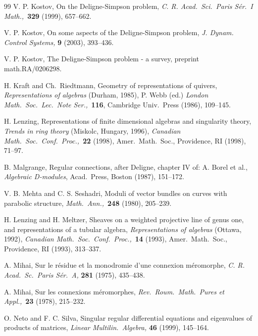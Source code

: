 \documentclass{amsart}
\theoremstyle{plain}
\theoremstyle{definition}
\theoremstyle{remark}
\newcommand{\smalltextsc}[1]{#1}
\begin{document}
\begin{thebibliography}{99}
V. P. \smalltextsc{Kostov},
On the Deligne-Simpson problem,
\textit{C. R. Acad.\ Sci.\ Paris S\'er.\ I Math.,}\ \textbf{329} (1999), 657--662.

V. P. \smalltextsc{Kostov},
On some aspects of the Deligne-Simpson problem,
\textit{J. Dynam. Control Systems,} \textbf{9} (2003), 393--436.

V. P. \smalltextsc{Kostov},
The Deligne-Simpson problem - a survey,
preprint math.RA/0206298.

H. \smalltextsc{Kraft} and Ch.\ \smalltextsc{Riedtmann},
Geometry of representations of quivers,
\textit{Representations of algebras} (Durham, 1985),
P. \smalltextsc{Webb} (ed.)
\textit{London Math.\ Soc.\ Lec.\ Note Ser.,}\ \textbf{116},
Cambridge Univ.\ Press (1986),
109--145.

H. \smalltextsc{Lenzing},
Representations of finite dimensional algebras and singularity theory,
\textit{Trends in ring theory} (Miskolc, Hungary, 1996),
\textit{Canadian Math.\ Soc.\ Conf.\ Proc.,}\ \textbf{22} (1998),
Amer.\ Math.\ Soc., Providence, RI (1998),
71--97.

B. \smalltextsc{Malgrange},
Regular connections, after Deligne,
chapter IV of: A. \smalltextsc{Borel} et al., \textit{Algebraic D-modules},
Acad.\ Press, Boston (1987), 151--172.

V. B. \smalltextsc{Mehta} and C. S. \smalltextsc{Seshadri},
Moduli of vector bundles on curves with parabolic structure,
\textit{Math.\ Ann.,}\ \textbf{248} (1980), 205--239.

H. \smalltextsc{Lenzing} and H. \smalltextsc{Meltzer},
Sheaves on a weighted projective line of genus one, and representations of a tubular algebra,
\textit{Representations of algebras} (Ottawa, 1992),
\textit{Canadian Math.\ Soc.\ Conf.\ Proc.,}\ \textbf{14} (1993),
Amer.\ Math.\ Soc., Providence, RI (1993),
313--337.

A. \smalltextsc{Mihai},
Sur le r\'esidue et la monodromie d'une connexion m\'eromorphe,
\textit{C. R. Acad.\ Sc.\ Paris S\'er.\ A,} \textbf{281} (1975), 435--438.

A. \smalltextsc{Mihai},
Sur les connexions m\'eromorphes,
\textit{Rev.\ Roum.\ Math.\ Pures et Appl.,}\ \textbf{23} (1978), 215--232.

O. \smalltextsc{Neto} and F. C. \smalltextsc{Silva},
Singular regular differential equations and eigenvalues of products of matrices,
\textit{Linear Multilin.\ Algebra,} \textbf{46} (1999), 145--164.


\end{thebibliography}
\end{document}
